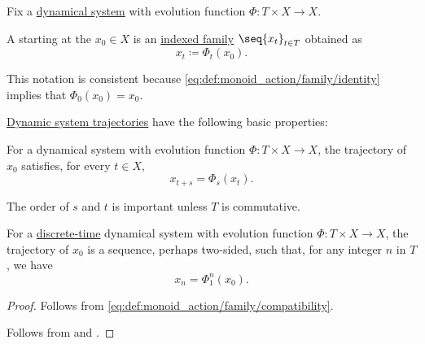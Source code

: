 \begin{definition}\label{def:dynamical_system_trajectory}\mimprovised
  Fix a \hyperref[def:dynamical_system]{dynamical system} with evolution function \( \Phi: T \times X \to X \).

  A  starting at the  \( x_0 \in X \) is an \hyperref[def:cartesian_product/indexed_family]{indexed family} \( \seq{ x_t }_{t \in T} \) obtained as
  \begin{equation*}
    x_t \coloneqq \Phi_t(x_0).
  \end{equation*}
\end{definition}
\begin{comments}
  \item This notation is consistent because \eqref{eq:def:monoid_action/family/identity} implies that \( \Phi_0(x_0) = x_0 \).
\end{comments}

\begin{proposition}\label{thm:def:dynamical_system_trajectory}
  \hyperref[def:dynamical_system_trajectory]{Dynamic system trajectories} have the following basic properties:
  \begin{thmenum}
     For a dynamical system with evolution function \( \Phi: T \times X \to X \), the trajectory of \( x_0 \) satisfies, for every \( t \in X \),
    \begin{equation*}
      x_{t+s} = \Phi_s(x_t).
    \end{equation*}

    The order of \( s \) and \( t \) is important unless \( T \) is commutative.

     For a \hyperref[def:dynamical_system_time_classification]{discrete-time} dynamical system with evolution function \( \Phi: T \times X \to X \), the trajectory of \( x_0 \) is a sequence, perhaps two-sided, such that, for any integer \( n \) in \( T \), we have
    \begin{equation*}
      x_n = \Phi_1^n(x_0).
    \end{equation*}
  \end{thmenum}
\end{proposition}
\begin{proof}
   Follows from \eqref{eq:def:monoid_action/family/compatibility}.

   Follows from  and .
\end{proof}
